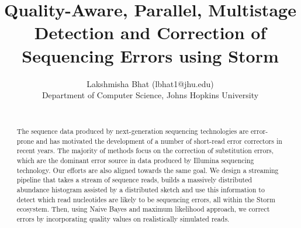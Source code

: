 \documentclass[11pt]{article}
\begin{document}
\pagestyle{plain} 
\title{Quality-Aware, Parallel, Multistage Detection and Correction of Sequencing Errors using Storm}
\large
\date{}
\author{Lakshmisha Bhat (lbhat1@jhu.edu) \\Department of Computer Science, Johns Hopkins University \\[2\baselineskip]\\ }
\maketitle
\vspace{-.5in}
\cfoot{\thepage}
\rfoot{}
\rhead{}


\begin{abstract}
The sequence data produced by next-generation sequencing technologies are error-prone and has motivated the development of a number of short-read error correctors in recent years. The majority of methods focus on the correction of substitution errors, which are the dominant error source in data produced by Illumina sequencing technology. Our efforts are also aligned towards the same goal. We design a streaming pipeline that takes a stream of sequence reads, builds a massively distributed abundance histogram assisted by a distributed sketch and use this information to detect which read nucleotides are likely to be sequencing errors, all within the Storm ecosystem. Then, using Naive Bayes and maximum likelihood approach, we correct errors by incorporating quality values on realistically simulated reads.\\
\end{abstract}
\end{document}
